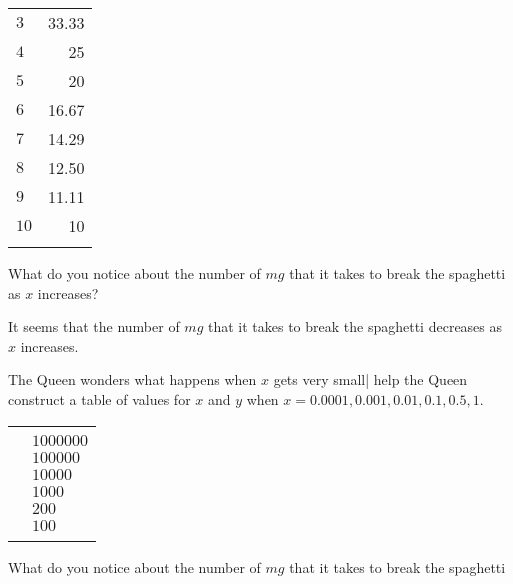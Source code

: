 \begin{problem}
\begin{subproblem}
\begin{shortsolution}
\begin{tabular}[t]{ld{2}}
			$3$           & 33.33         \\\normalline
			$4$           & 25            \\\normalline
			$5$           & 20            \\\normalline
			$6$           & 16.67         \\\normalline
			$7$           & 14.29         \\\normalline
			$8$           & 12.50         \\\normalline
			$9$           & 11.11         \\\normalline
			$10$          & 10            \\\lastline
		\end{tabular}
	\end{shortsolution}
\end{subproblem}
\begin{subproblem}
	What do you notice about the number of $\unit{mg}$ that it takes to break 
	the spaghetti as $x$ increases?
	\begin{shortsolution}
		It seems that the number of $\unit{mg}$ that it takes to break the spaghetti decreases
		as $x$ increases.
	\end{shortsolution}
\end{subproblem}
\begin{subproblem}\label{rat:prob:spaglt1}
	The Queen wonders what happens when $x$ gets very small| help the Queen construct 
	a table of values for $x$ and $y$ when $x=0.0001, 0.001, 0.01, 0.1, 0.5, 1$.
	\begin{shortsolution}
		\begin{tabular}[t]{d{2}l}
			\beforeheading
			 &  \\
			        & $1000000$     \\         & $100000$      \\          & $10000$       \\           & $1000$        \\           & $200$         \\             & $100$         \\\lastline
		\end{tabular}
	\end{shortsolution}
\end{subproblem}
\begin{subproblem}
	What do you notice about the number of $\unit{mg}$ that it takes to break the spaghetti

\end{subproblem}
\end{problem}
